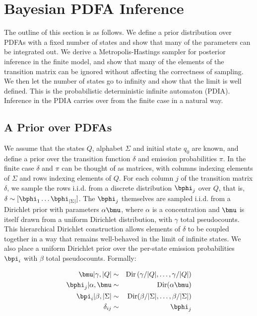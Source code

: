 \section{Bayesian PDFA Inference}

The outline of this section is as follows.  We define a prior distribution over PDFAs with a fixed number of states and show that many of the parameters can be integrated out.  We derive a Metropolis-Hastings sampler for posterior inference in the finite model, and show that many of the elements of the transition matrix can be ignored without affecting the correctness of sampling.  We then let the number of states go to infinity and show that the limit is well defined.  This is the probabilistic deterministic infinite automaton (PDIA).  Inference in the PDIA carries over from the finite case in a natural way.

\subsection{A Prior over PDFAs}

We assume that the states $Q$, alphabet $\Sigma$ and initial state $q_0$ are known, and define a prior over the transition function $\delta$ and emission probabilities $\pi$.  In the finite case $\delta$ and $\pi$ can be thought of as matrices, with columns indexing elements of $\Sigma$ and rows indexing elements of $Q$.  For each column $j$ of the transition matrix $\delta$, we sample the rows i.i.d. from a discrete distribution $\bphi_j$ over $Q$, that is, $\delta \sim [\bphi_1\ldots\bphi_{|\Sigma|}]$.  The $\bphi_j$ themselves are sampled i.i.d. from a Dirichlet prior with parameters $\alpha\bmu$, where $\alpha$ is a concentration and $\bmu$ is itself drawn from a uniform Dirichlet distribution, with $\gamma$ total pseudocounts.  This hierarchical Dirichlet construction allows elements of $\delta$ to be coupled together in a way that remains well-behaved in the limit of infinite states.  We also place a uniform Dirichlet prior over the per-state emission probabilities $\bpi_i$ with $\beta$ total pseudocounts.  Formally:

\begin{eqnarray}
\bmu|\gamma,|Q| & \sim & \mathrm{Dir}\left(\gamma/|Q|,\ldots,\gamma/|Q|\right) \\
\bphi_{j}|\alpha,\bmu  & \sim & \mathrm{Dir}(\alpha\bmu) \\
\bpi_{i}|\beta,|\Sigma| & \sim & \mathrm{Dir}(\beta/|\Sigma|,\ldots,\beta/|\Sigma|)\\
\delta_{ij} & \sim & \bphi_{j}
\end{eqnarray}

